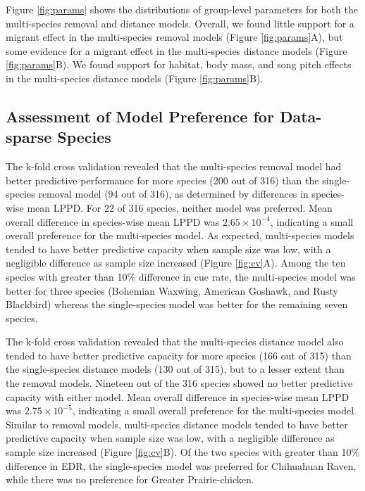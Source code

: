 \documentclass[12pt]{article}
\begin{document}
\par Figure \ref{fig:params} shows the distributions of group-level parameters for both the multi-species removal and distance models. 
Overall, we found little support for a migrant effect in the multi-species removal models (Figure \ref{fig:params}A), but some evidence for a migrant effect in the multi-species distance models (Figure \ref{fig:params}B).
We found support for habitat, body mass, and song pitch effects in the multi-species distance models (Figure \ref{fig:params}B).

\subsection{Assessment of Model Preference for Data-sparse Species}

\par The k-fold cross validation revealed that the multi-species removal model had better predictive performance for more species (200 out of 316) than the single-species removal model (94 out of 316), as determined by differences in species-wise mean LPPD.
For 22 of 316 species, neither model was preferred.
Mean overall difference in species-wise mean LPPD was $2.65 \times 10^{-4}$, indicating a small overall preference for the multi-species model.
As expected, multi-species models tended to have better predictive capacity when sample size was low, with a negligible difference as sample size increased (Figure \ref{fig:cv}A).
Among the ten species with greater than 10\% difference in cue rate, the multi-species model was better for three species (Bohemian Waxwing, American Goshawk, and Rusty Blackbird) whereas the single-species model was better for the remaining seven species.

\par The k-fold cross validation revealed that the multi-species distance model also tended to have better predictive capacity for more species (166 out of 315) than the single-species distance models (130 out of 315), but to a lesser extent than the removal models.
Nineteen out of the 316 species showed no better predictive capacity with either model.
Mean overall difference in species-wise mean LPPD was $2.75 \times 10^{-5}$, indicating a small overall preference for the multi-species model.
Similar to removal models, multi-species distance models tended to have better predictive capacity when sample size was low, with a negligible difference as sample size increased (Figure \ref{fig:cv}B).
Of the two species with greater than 10\% difference in EDR, the single-species model was preferred for Chihuahuan Raven, while there was no preference for Greater Prairie-chicken.
\end{document}
